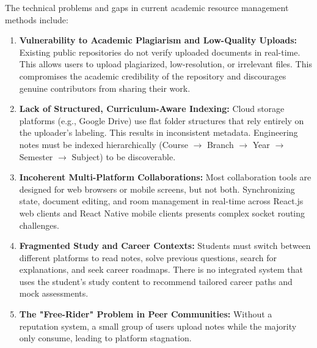 \documentclass[12,Times new Roman,a4paper]{report}
\begin{document}
The technical problems and gaps in current academic resource management methods include:
\begin{enumerate}
    \item \textbf{Vulnerability to Academic Plagiarism and Low-Quality Uploads:} Existing public repositories do not verify uploaded documents in real-time. This allows users to upload plagiarized, low-resolution, or irrelevant files. This compromises the academic credibility of the repository and discourages genuine contributors from sharing their work.
    \item \textbf{Lack of Structured, Curriculum-Aware Indexing:} Cloud storage platforms (e.g., Google Drive) use flat folder structures that rely entirely on the uploader's labeling. This results in inconsistent metadata. Engineering notes must be indexed hierarchically (Course $\rightarrow$ Branch $\rightarrow$ Year $\rightarrow$ Semester $\rightarrow$ Subject) to be discoverable.
    \item \textbf{Incoherent Multi-Platform Collaborations:} Most collaboration tools are designed for web browsers or mobile screens, but not both. Synchronizing state, document editing, and room management in real-time across React.js web clients and React Native mobile clients presents complex socket routing challenges.
    \item \textbf{Fragmented Study and Career Contexts:} Students must switch between different platforms to read notes, solve previous questions, search for explanations, and seek career roadmaps. There is no integrated system that uses the student's study content to recommend tailored career paths and mock assessments.
    \item \textbf{The "Free-Rider" Problem in Peer Communities:} Without a reputation system, a small group of users upload notes while the majority only consume, leading to platform stagnation.
\end{enumerate}
\end{document}
